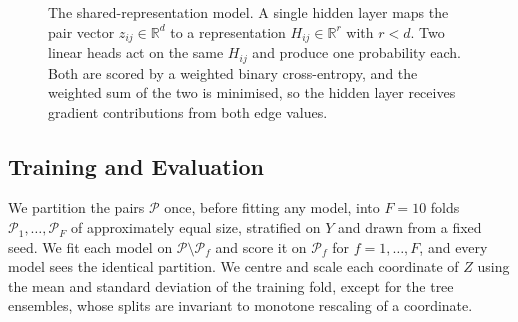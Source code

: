 \begin{figure}[htbp]
{%
}
  \caption[The shared-representation model]{The shared-representation model. A single hidden layer maps the
  pair vector \(z_{ij}\in\mathbb{R}^{d}\) to a representation \(H_{ij}\in\mathbb{R}^{r}\) with \(r<d\).
  Two linear heads act on the same \(H_{ij}\) and produce one probability each. Both are scored by a
  weighted binary cross-entropy, and the weighted sum of the two is minimised, so the hidden layer receives
  gradient contributions from both edge values.}
  \label{fig:latent}
\end{figure}
\FloatBarrier

\subsection{Training and Evaluation}
\label{sec:eval}

We partition the pairs \(\mathcal{P}\) once, before fitting any model, into \(F=10\) folds
\(\mathcal{P}_{1},\dots,\mathcal{P}_{F}\) of approximately equal size, stratified on \(Y\) and drawn from
a fixed seed. We fit each model on \(\mathcal{P}\setminus\mathcal{P}_{f}\) and score it on
\(\mathcal{P}_{f}\) for \(f=1,\dots,F\), and every model sees the identical partition. We centre and
scale each coordinate of \(Z\) using the mean and standard deviation of the training fold, except for the
tree ensembles, whose splits are invariant to monotone rescaling of a coordinate.

